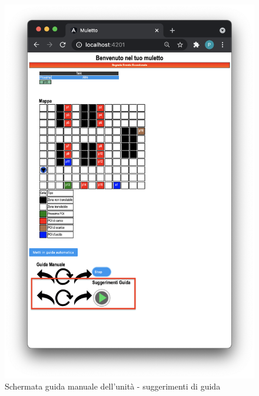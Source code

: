 \begin{itemize}
\begin{figure}[H]
          \includegraphics[scale=0.45]{res/images/suggerimenti.png}
          \caption{Schermata guida manuale dell'unità - suggerimenti di guida}
    \end{figure}
\end{itemize}

